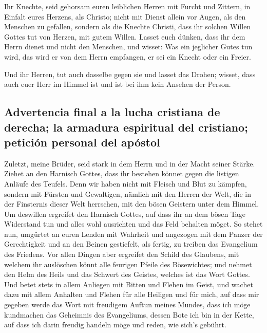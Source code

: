  Ihr Knechte, seid gehorsam euren leiblichen Herren mit
Furcht und Zittern, in Einfalt eures Herzens, als Christo;
 nicht mit Dienst allein vor Augen, als den Menschen zu
gefallen, sondern als die Knechte Christi, dass ihr solchen Willen
Gottes tut von Herzen, mit gutem Willen.  Lasset euch
dünken, dass ihr dem Herrn dienet und nicht den Menschen, 
und wisset: Was ein jeglicher Gutes tun wird, das wird er von dem Herrn
empfangen, er sei ein Knecht oder ein Freier.

 Und ihr Herren, tut auch dasselbe gegen sie und lasset
das Drohen; wisset, dass auch euer Herr im Himmel ist und ist bei ihm
kein Ansehen der Person.

\hypertarget{advertencia-final-a-la-lucha-cristiana-de-derecha-la-armadura-espiritual-del-cristiano-peticiuxf3n-personal-del-apuxf3stol}{%
\subsection{Advertencia final a la lucha cristiana de derecha; la
armadura espiritual del cristiano; petición personal del
apóstol}\label{advertencia-final-a-la-lucha-cristiana-de-derecha-la-armadura-espiritual-del-cristiano-peticiuxf3n-personal-del-apuxf3stol}}

 Zuletzt, meine Brüder, seid stark in dem Herrn und in
der Macht seiner Stärke.  Ziehet an den Harnisch Gottes,
dass ihr bestehen könnet gegen die listigen Anläufe des Teufels.
 Denn wir haben nicht mit Fleisch und Blut zu kämpfen,
sondern mit Fürsten und Gewaltigen, nämlich mit den Herren der Welt, die
in der Finsternis dieser Welt herrschen, mit den bösen Geistern unter
dem Himmel.  Um deswillen ergreifet den Harnisch Gottes,
auf dass ihr an dem bösen Tage Widerstand tun und alles wohl ausrichten
und das Feld behalten möget.  So stehet nun, umgürtet an
euren Lenden mit Wahrheit und angezogen mit dem Panzer der Gerechtigkeit
 und an den Beinen gestiefelt, als fertig, zu treiben das
Evangelium des Friedens.  Vor allen Dingen aber ergreifet
den Schild des Glaubens, mit welchem ihr auslöschen könnt alle feurigen
Pfeile des Bösewichtes;  und nehmet den Helm des Heils
und das Schwert des Geistes, welches ist das Wort Gottes.
 Und betet stets in allem Anliegen mit Bitten und Flehen
im Geist, und wachet dazu mit allem Anhalten und Flehen für alle
Heiligen  und für mich, auf dass mir gegeben werde das
Wort mit freudigem Auftun meines Mundes, dass ich möge kundmachen das
Geheimnis des Evangeliums,  dessen Bote ich bin in der
Kette, auf dass ich darin freudig handeln möge und reden, wie sich's
gebührt.

